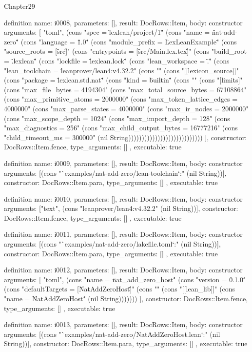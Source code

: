 \begin{lexlean}{Chapter29}
\begin{semanticmodule}
definition{
  name: i0008,
  parameters: [],
  result: DocRows::Item,
  body: constructor{
    arguments: [
      "toml",
      (cons "spec = \"lexlean/project/1\"" (cons "name = \"nat-add-zero\"" (cons "language = \"1.0\"" (cons "module_prefix = \"LexLeanExample\"" (cons "source_roots = [\"src\"]" (cons "entrypoints = [\"src/Main.lex.tex\"]" (cons "build_root = \".lexlean\"" (cons "lockfile = \"lexlean.lock\"" (cons "lean_workspace = \".\"" (cons "lean_toolchain = \"leanprover/lean4:v4.32.2\"" (cons "" (cons "[[lexicon_source]]" (cons "package = \"lexlean.std.nat\"" (cons "kind = \"builtin\"" (cons "" (cons "[limits]" (cons "max_file_bytes = 4194304" (cons "max_total_source_bytes = 67108864" (cons "max_primitive_atoms = 2000000" (cons "max_token_lattice_edges = 4000000" (cons "max_parse_states = 4000000" (cons "max_ir_nodes = 2000000" (cons "max_scope_depth = 1024" (cons "max_import_depth = 128" (cons "max_diagnostics = 256" (cons "max_child_output_bytes = 16777216" (cons "child_timeout_ms = 300000" (nil String))))))))))))))))))))))))))))
    ],
    constructor: DocRows::Item.fence,
    type_arguments: []
  },
  executable: true
}

definition{
  name: i0009,
  parameters: [],
  result: DocRows::Item,
  body: constructor{
    arguments: [(cons "`examples/nat-add-zero/lean-toolchain`:" (nil String))],
    constructor: DocRows::Item.para,
    type_arguments: []
  },
  executable: true
}

definition{
  name: i0010,
  parameters: [],
  result: DocRows::Item,
  body: constructor{
    arguments: ["text", (cons "leanprover/lean4:v4.32.2" (nil String))],
    constructor: DocRows::Item.fence,
    type_arguments: []
  },
  executable: true
}

definition{
  name: i0011,
  parameters: [],
  result: DocRows::Item,
  body: constructor{
    arguments: [(cons "`examples/nat-add-zero/lakefile.toml`:" (nil String))],
    constructor: DocRows::Item.para,
    type_arguments: []
  },
  executable: true
}

definition{
  name: i0012,
  parameters: [],
  result: DocRows::Item,
  body: constructor{
    arguments: [
      "toml",
      (cons "name = \"nat_add_zero_host\"" (cons "version = \"0.1.0\"" (cons "defaultTargets = [\"NatAddZeroHost\"]" (cons "" (cons "[[lean_lib]]" (cons "name = \"NatAddZeroHost\"" (nil String)))))))
    ],
    constructor: DocRows::Item.fence,
    type_arguments: []
  },
  executable: true
}

definition{
  name: i0013,
  parameters: [],
  result: DocRows::Item,
  body: constructor{
    arguments: [(cons "`examples/nat-add-zero/NatAddZeroHost.lean`:" (nil String))],
    constructor: DocRows::Item.para,
    type_arguments: []
  },
  executable: true
}


\end{semanticmodule}
\end{lexlean}
